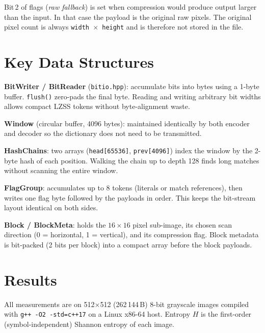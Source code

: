 \documentclass[a4paper,11pt]{article}
\begin{document}
Bit\,2 of flags (\emph{raw fallback}) is set when compression would produce
output larger than the input.  In that case the payload is the original raw
pixels.  The original pixel count is always \texttt{width~$\times$~height}
and is therefore not stored in the file.

\section{Key Data Structures}

\textbf{BitWriter / BitReader} (\texttt{bitio.hpp}): accumulate bits into
bytes using a 1-byte buffer.  \texttt{flush()} zero-pads the final byte.
Reading and writing arbitrary bit widths allows compact LZSS tokens without
byte-alignment waste.

\textbf{Window} (circular buffer, 4096 bytes): maintained identically by
both encoder and decoder so the dictionary does not need to be transmitted.

\textbf{HashChains}: two arrays (\texttt{head[65536]}, \texttt{prev[4096]})
index the window by the 2-byte hash of each position.  Walking the chain up
to depth 128 finds long matches without scanning the entire window.

\textbf{FlagGroup}: accumulates up to 8 tokens (literals or match
references), then writes one flag byte followed by the payloads in order.
This keeps the bit-stream layout identical on both sides.

\textbf{Block / BlockMeta}: holds the $16\!\times\!16$ pixel sub-image, its
chosen scan direction (0 = horizontal, 1 = vertical), and its compression
flag.  Block metadata is bit-packed (2 bits per block) into a compact array
before the block payloads.

\section{Results}

All measurements are on 512$\times$512 (262\,144\,B) 8-bit grayscale images
compiled with \texttt{g++ -O2 -std=c++17} on a Linux x86-64 host.
Entropy $H$ is the first-order (symbol-independent) Shannon entropy of each
image.
\end{document}
